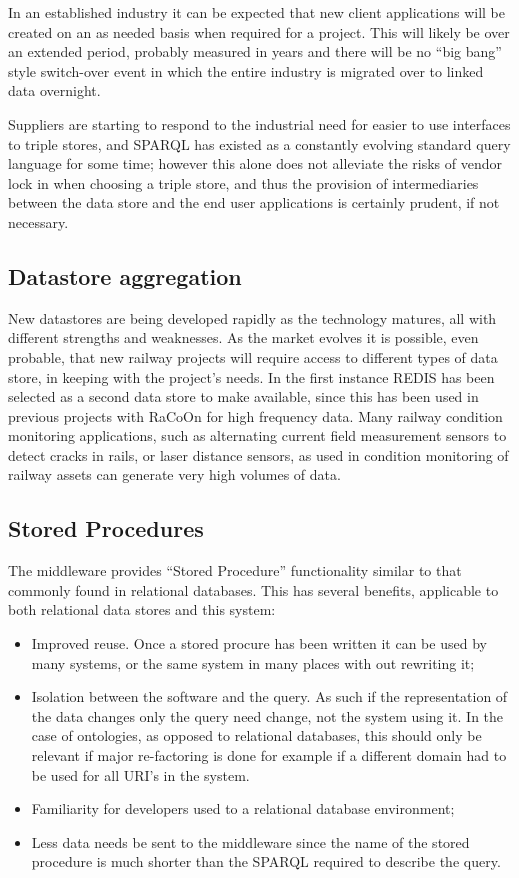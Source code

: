 In an established industry it can be expected that new client applications will be created on an as needed basis when required for a project. This will likely be over an extended period, probably measured in years and there will be no \enquote{big bang} style switch-over event in which the entire industry is migrated over to linked data overnight. 

Suppliers are starting to respond to the industrial need for easier to use interfaces to triple stores, and SPARQL has existed as a constantly evolving standard query language for some time; however this alone does not alleviate the risks of vendor lock in when choosing a triple store, and thus the provision of intermediaries between the data store and the end user applications is certainly prudent, if not necessary.

\subsection{Datastore aggregation}
New datastores are being developed rapidly as the technology matures, all with different strengths and weaknesses. As the market evolves it is possible, even probable, that new railway projects will require access to different types of data store, in keeping with the project's needs. In the first instance REDIS has been selected as a second data store to make available, since this has been used in previous projects with RaCoOn for high frequency data. Many railway condition monitoring applications, such as alternating current field measurement sensors to detect cracks in rails, or laser distance sensors, as used in condition monitoring of railway assets can generate very high volumes of data.
\subsection{Stored Procedures}
The middleware provides \enquote{Stored Procedure} functionality similar to that commonly found in relational databases. This has several benefits, applicable to both relational data stores and this system:

\begin{itemize}
    \item Improved reuse. Once a stored procure has been written it can be used by many systems, or the same system in many places with out rewriting it;
   \item Isolation between the software and the query. As such if the representation of the data changes only the query need change, not the system using it. In the case of ontologies, as opposed to relational databases, this should only be relevant if major re-factoring is done for example if a different domain had to be used for all URI's in the system.
    \item Familiarity for developers used to a relational database environment;    
    \item Less data needs be sent to the middleware since the name of the stored procedure is much shorter than the SPARQL required to describe the query. 
\end{itemize}

